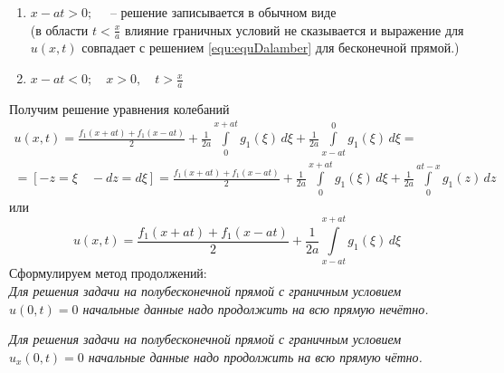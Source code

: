 \begin{enumerate}
	\item $x - at > 0; \quad$ -- решение записывается в обычном виде\\ (в области $t < \frac{x}{a}$ влияние граничных условий не сказывается и выражение для $u(x, t)$ совпадает с решением \eqref{equ:equDalamber} для бесконечной прямой.)\\
	\item $x - at < 0; \quad  x > 0,\quad  t > \frac{x}{a}$
\end{enumerate}
Получим решение уравнения колебаний
\begin{multline*}
	u(x, t) = \frac{f_1(x + at) + f_1(x - at)}{2} + \frac{1}{2a} \int\limits_0^{x +at} g_1(\xi)\, d \xi + \frac{1}{2 a} \int\limits_{x - at}^0 g_1 (\xi )\, d\xi =\\= [-z = \xi \quad -dz = d\xi ] 
	= \frac{f_1(x + at) + f_1(x - at)}{2} +  \frac{1}{2a} \int\limits_0^{x +at} g_1(\xi)\, d \xi + \frac{1}{2 a} \int\limits_0^{at -x} g_1 (z )\, dz
\end{multline*}
или
\[
	u(x, t) = \frac{f_1(x + at) + f_1(x - at)}{2} + \frac{1}{2a} \int\limits_{x-at}^{x+at} g_1(\xi)\, d\xi
\]
Сформулируем метод продолжений:\\

\textit{Для решения задачи на полубесконечной прямой с граничным условием $u(0, t) = 0$ начальные данные надо продолжить на всю прямую нечётно.}

\textit{Для решения задачи на полубесконечной прямой с граничным условием $u_x(0, t) = 0$ начальные данные надо продолжить на всю прямую чётно.}\\


